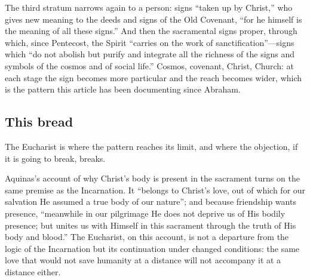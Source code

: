 The third stratum narrows again to a person: signs ``taken up by Christ,'' who gives new meaning to the deeds and signs of the Old Covenant, ``for he himself is the meaning of all these signs.'' And then the sacramental signs proper, through which, since Pentecost, the Spirit ``carries on the work of sanctification''---signs which ``do not abolish but purify and integrate all the richness of the signs and symbols of the cosmos and of social life.'' Cosmos, covenant, Christ, Church: at each stage the sign becomes more particular and the reach becomes wider, which is the pattern this article has been documenting since Abraham.

\subsection{This bread}

The Eucharist is where the pattern reaches its limit, and where the objection, if it is going to break, breaks.

Aquinas's account of why Christ's body is present in the sacrament turns on the same premise as the Incarnation. It ``belongs to Christ's love, out of which for our salvation He assumed a true body of our nature''; and because friendship wants presence, ``meanwhile in our pilgrimage He does not deprive us of His bodily presence; but unites us with Himself in this sacrament through the truth of His body and blood.'' The Eucharist, on this account, is not a departure from the logic of the Incarnation but its continuation under changed conditions: the same love that would not save humanity at a distance will not accompany it at a distance either.

